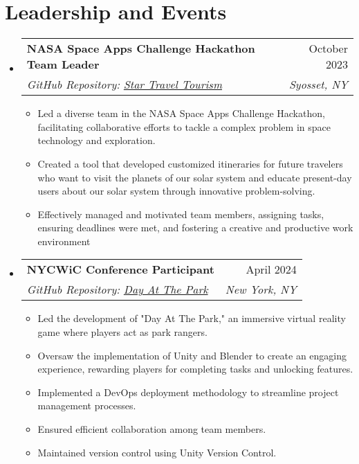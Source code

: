 \documentclass[letterpaper,11pt]{article}
\makeatletter
\newcommand{\resumeItem}[1]{
  \item\small{
    {#1 \vspace{-2pt}}
  }
}
\newcommand{\resumeSubheading}[4]{
  \vspace{-2pt}\item
    \begin{tabular*}{0.97\textwidth}[t]{l@{\extracolsep{\fill}}r}
      \textbf{#1} & #2 \\
      \textit{\small#3} & \textit{\small #4} \\
    \end{tabular*}\vspace{-7pt}
}
\newcommand{\resumeSubHeadingListStart}{\begin{itemize}[leftmargin=0.15in, label={}]}
\newcommand{\resumeSubHeadingListEnd}{\end{itemize}}
\newcommand{\resumeItemListStart}{\begin{itemize}}
\newcommand{\resumeItemListEnd}{\end{itemize}\vspace{-5pt}}
\makeatother
\begin{document}


\section{Leadership and Events}
  \resumeSubHeadingListStart

    \resumeSubheading
      {NASA Space Apps Challenge Hackathon Team Leader}{October 2023}
      {GitHub Repository: \href{https://github.com/ShaniaB417/Star-Travel-Tourism}{Star Travel Tourism}}{Syosset, NY}
      \resumeItemListStart
        \resumeItem{Led a diverse team in the NASA Space Apps Challenge Hackathon, facilitating collaborative efforts to tackle a complex problem in space technology and exploration.}
        \resumeItem{Created a tool that developed customized itineraries for future travelers who want to visit the planets of our solar system and educate present-day users about our solar system through innovative problem-solving.}
        \resumeItem{Effectively managed and motivated team members, assigning tasks, ensuring deadlines were met, and fostering a creative and productive work environment}
      \resumeItemListEnd
    
    \resumeSubheading
      {NYCWiC Conference Participant}{April 2024}
      {GitHub Repository: \href{https://github.com/ShaniaB417/Day-At-The-Park}{Day At The Park}}{New York, NY}
      \resumeItemListStart
        \resumeItem{Led the development of "Day At The Park," an immersive virtual reality game where players act as park rangers.}
        \resumeItem{Oversaw the implementation of Unity and Blender to create an engaging experience, rewarding players for completing tasks and unlocking features.}
        \resumeItem{Implemented a DevOps deployment methodology to streamline project management processes.}
        \resumeItem{Ensured efficient collaboration among team members.}
        \resumeItem{Maintained version control using Unity Version Control.}
      \resumeItemListEnd
    
  \resumeSubHeadingListEnd
    
\end{document}
